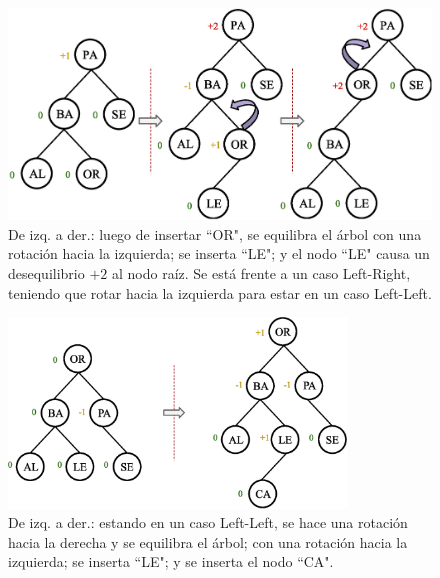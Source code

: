 \begin{figure}[htpb!]
  \begin{center}
    \includegraphics[width=1.0\textwidth]{images/AVLInsertion3.eps}
  \end{center}
  \caption{De izq. a der.: luego de insertar ``OR", se equilibra el árbol con una rotación hacia la izquierda; se inserta ``LE"; y el nodo ``LE" causa un desequilibrio $+2$ al nodo raíz. Se está frente a un caso Left-Right, teniendo que rotar hacia la izquierda para estar en un caso Left-Left.}
  \label{fig:AVLInsertion3}
\end{figure}

\begin{figure}[htpb!]
  \begin{center}
    \includegraphics[width=0.8\textwidth]{images/AVLInsertion4.eps}
  \end{center}
  \caption{De izq. a der.: estando en un caso Left-Left, se hace una rotación hacia la derecha y se equilibra el árbol; con una rotación hacia la izquierda; se inserta ``LE"; y se inserta el nodo ``CA".}
  \label{fig:AVLInsertion4}
\end{figure}


